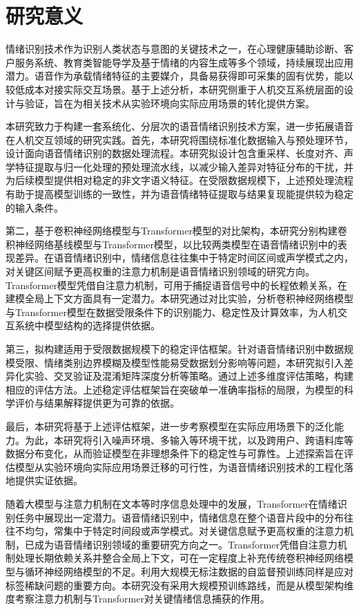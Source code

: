 \section{研究意义} 

情绪识别技术作为识别人类状态与意图的关键技术之一，在心理健康辅助诊断、客户服务系统、教育类智能导学及基于情绪的内容生成等多个领域，持续展现出应用潜力。语音作为承载情绪特征的主要媒介，具备易获得即可采集的固有优势，能以较低成本对接实际交互场景。基于上述分析，本研究侧重于人机交互系统层面的设计与验证，旨在为相关技术从实验环境向实际应用场景的转化提供方案。

本研究致力于构建一套系统化、分层次的语音情绪识别技术方案，进一步拓展语音在人机交互领域的研究实践。首先，本研究将围绕标准化数据输入与预处理环节，设计面向语音情绪识别的数据处理流程。本研究拟设计包含重采样、长度对齐、声学特征提取与归一化处理的预处理流水线，以减少输入差异对特征分布的干扰，并为后续模型提供相对稳定的非文字语义特征。在受限数据规模下，上述预处理流程有助于提高模型训练的一致性，并为语音情绪特征提取与结果复现能提供较为稳定的输入条件。

第二，基于卷积神经网络模型与Transformer模型的对比架构，本研究分别构建卷积神经网络基线模型与Transformer模型，以比较两类模型在语音情绪识别中的表现差异。在语音情绪识别中，情绪信息往往集中于特定时间区间或声学模式之内，对关键区间赋予更高权重的注意力机制是语音情绪识别领域的研究方向\cite{mirsamadi2017automatic,chen2023dwformer,wang2024swin}。Transformer模型凭借自注意力机制，可用于捕捉语音信号中的长程依赖关系，在建模全局上下文方面具有一定潜力。本研究通过对比实验，分析卷积神经网络模型与Transformer模型在数据受限条件下的识别能力、稳定性及计算效率，为人机交互系统中模型结构的选择提供依据。

第三，拟构建适用于受限数据规模下的稳定评估框架。针对语音情绪识别中数据规模受限、情绪类别边界模糊及模型性能易受数据划分影响等问题，本研究拟引入差异化实验、交叉验证及混淆矩阵深度分析等策略。通过上述多维度评估策略，构建相应的评估方法。上述稳定评估框架旨在突破单一准确率指标的局限，为模型的科学评价与结果解释提供更为可靠的依据。

最后，本研究将基于上述评估框架，进一步考察模型在实际应用场景下的泛化能力。为此，本研究将引入噪声环境、多输入等环境干扰，以及跨用户、跨语料库等数据分布变化，从而验证模型在非理想条件下的稳定性与可靠性。上述探索旨在评估模型从实验环境向实际应用场景迁移的可行性，为语音情绪识别技术的工程化落地提供实证依据。

随着大模型与注意力机制在文本等时序信息处理中的发展，Transformer在情绪识别任务中展现出一定潜力。语音情绪识别中，情绪信息在整个语音片段中的分布往往不均匀，常集中于特定时间段或声学模式。对关键信息赋予更高权重的注意力机制，已成为语音情绪识别领域的重要研究方向之一\cite{mirsamadi2017automatic,chen2023dwformer,wang2024swin}。Transformer凭借自注意力机制处理长期依赖关系并整合全局上下文，可在一定程度上补充传统卷积神经网络模型与循环神经网络模型的不足\cite{liu2023dualrobustness}。利用大规模无标注数据的自监督预训练同样是应对标签稀缺问题的重要方向\cite{thanh2024robust,sampath2025efficient}。本研究没有采用大规模预训练路线，而是从模型架构维度考察注意力机制与Transformer对关键情绪信息捕获的作用。



